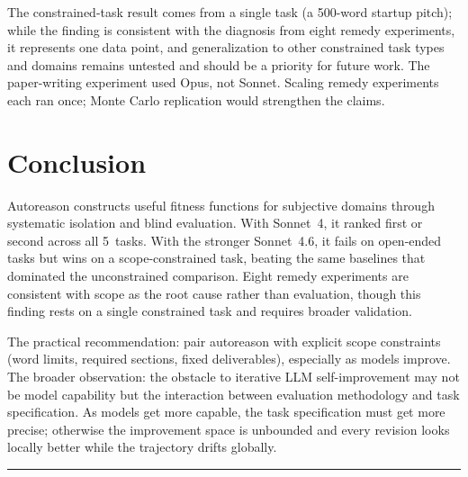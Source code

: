 \documentclass[10pt,twocolumn]{article}
\begin{document}
The constrained-task result comes from a single task (a 500-word startup pitch); while the finding is consistent with the diagnosis from eight remedy experiments, it represents one data point, and generalization to other constrained task types and domains remains untested and should be a priority for future work. The paper-writing experiment used Opus, not Sonnet. Scaling remedy experiments each ran once; Monte Carlo replication would strengthen the claims.

\section{Conclusion}

Autoreason constructs useful fitness functions for subjective domains through systematic isolation and blind evaluation. With Sonnet~4, it ranked first or second across all 5~tasks. With the stronger Sonnet~4.6, it fails on open-ended tasks but wins on a scope-constrained task, beating the same baselines that dominated the unconstrained comparison. Eight remedy experiments are consistent with scope as the root cause rather than evaluation, though this finding rests on a single constrained task and requires broader validation.

The practical recommendation: pair autoreason with explicit scope constraints (word limits, required sections, fixed deliverables), especially as models improve. The broader observation: the obstacle to iterative LLM self-improvement may not be model capability but the interaction between evaluation methodology and task specification. As models get more capable, the task specification must get more precise; otherwise the improvement space is unbounded and every revision looks locally better while the trajectory drifts globally.

\vspace{4pt}
\hrule
\vspace{6pt}
\end{document}
